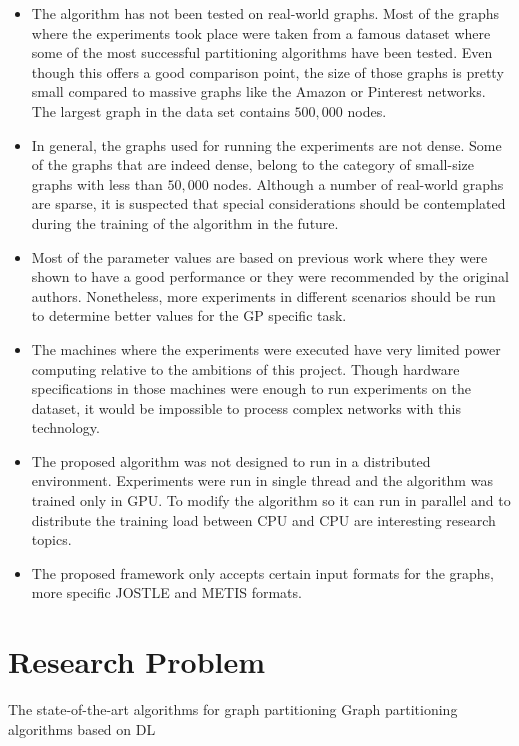 \begin{itemize}
    \item The algorithm has not been tested on real-world graphs. Most of the graphs where the experiments took place were taken from a famous dataset where some of the most successful partitioning algorithms have been tested. Even though this offers a good comparison point, the size of those graphs is pretty small compared to massive graphs like the Amazon or Pinterest networks. The largest graph in the data set contains $500,000$ nodes.
    \item In general, the graphs used for running the experiments are not dense. Some of the graphs that are indeed dense, belong to the category of small-size graphs with less than $50,000$ nodes. Although a number of real-world graphs are sparse, it is suspected that special considerations should be contemplated during the training of the algorithm in the future.
    \item Most of the parameter values are based on previous work where they were shown to have a good performance or they were recommended by the original authors. Nonetheless, more experiments in different scenarios should be run to determine better values for the GP specific task.
    \item The machines where the experiments were executed have very limited power computing relative to the ambitions of this project. Though hardware specifications in those machines were enough to run experiments on the dataset, it would be impossible to process complex networks with this technology.
    \item The proposed algorithm was not designed to run in a distributed environment. Experiments were run in single thread and the algorithm was trained only in GPU. To modify the algorithm so it can run in parallel and to distribute the training load between CPU and CPU are interesting research topics. 
    \item The proposed framework only accepts certain input formats for the graphs, more specific JOSTLE and METIS formats.
\end{itemize}

\section{Research Problem}
The state-of-the-art algorithms for graph partitioning 
Graph partitioning algorithms based on DL

